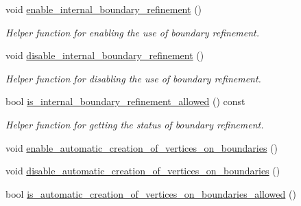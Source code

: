 \begin{DoxyCompactItemize}
$$void \hyperlink{classoomph_1_1TriangleMeshParameters_ad74f95b604041ec0e6da254bb01c6289}{enable\+\_\+internal\+\_\+boundary\+\_\+refinement} ()
\begin{DoxyCompactList}\small\item\em Helper function for enabling the use of boundary refinement. \end{DoxyCompactList}\item 
void \hyperlink{classoomph_1_1TriangleMeshParameters_a65624d572188eaf21b458dd51a4d9a2e}{disable\+\_\+internal\+\_\+boundary\+\_\+refinement} ()
\begin{DoxyCompactList}\small\item\em Helper function for disabling the use of boundary refinement. \end{DoxyCompactList}\item 
bool \hyperlink{classoomph_1_1TriangleMeshParameters_ae54c65b4b09b0363256373ff9a9619be}{is\+\_\+internal\+\_\+boundary\+\_\+refinement\+\_\+allowed} () const
\begin{DoxyCompactList}\small\item\em Helper function for getting the status of boundary refinement. \end{DoxyCompactList}\item 
void \hyperlink{classoomph_1_1TriangleMeshParameters_a6448159477b5b99adcb942c1cbf82a07}{enable\+\_\+automatic\+\_\+creation\+\_\+of\+\_\+vertices\+\_\+on\+\_\+boundaries} ()
\item 
void \hyperlink{classoomph_1_1TriangleMeshParameters_a5b233318ec4e4635d7b74c27d0c6287c}{disable\+\_\+automatic\+\_\+creation\+\_\+of\+\_\+vertices\+\_\+on\+\_\+boundaries} ()
\item 
bool \hyperlink{classoomph_1_1TriangleMeshParameters_a1c4b2e2d3d8831d46e42bd432fdcae32}{is\+\_\+automatic\+\_\+creation\+\_\+of\+\_\+vertices\+\_\+on\+\_\+boundaries\+\_\+allowed} ()
\end{DoxyCompactItemize}
